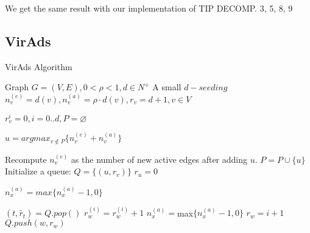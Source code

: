 We get the same result with our implementation of TIP DECOMP. 3, 5, 8, 9
\subsection{VirAds} 


\begin{algorithm}
	\caption{VirAds Algorithm}
	\begin{algorithmic}[1]
		
		
		\Require Graph $G = (V,E),0<\rho<1,d\in N^{+}$
		\Ensure A small $d-seeding$ 
		\State $n_{v}^{(e)} = d(v),n_{v}^{(a)} = \rho \cdot d(v), r_{v}  = d + 1, v \in V $
		
		\State $r_{v}^{i}=0, i=0..d, P  = \varnothing $
		
		
		\Repeat
		\State $u  = argmax_{v\not\in P}\{n_{v}^{(e)}+n_{v}^{(a)}\}$ 
		
		Recompute $n_{v}^{(e)}$ as the number of new active edges after adding $u$.
		\State $P  = P \cup \{u\} $
		\State Initialize a queue: $Q  = \{(u,r_{v})\} $
		\State $r_u = 0 $
		
		\State $n_{x}^{(a)}  = max\{n_{x}^{(a)}-1,0\} $
		
		\EndFor
		\State$(t,\widetilde{r_{t}})  = Q.pop() $
		\State $r_{w}^{(i)}=r_{w}^{(i)}+1 $
		\State $n_{x}^{(a)} =$max$\{n_{x}^{(a)}-1,0\} $	
		\EndFor
		\State $r_{w}=i+1 $
		\State $Q.push(w,r_{w}) $	
		\EndIf
		\EndIf
		\EndFor
		\EndFor
		\EndWhile
		\EndWhile
	\end{algorithmic}
\end{algorithm}
